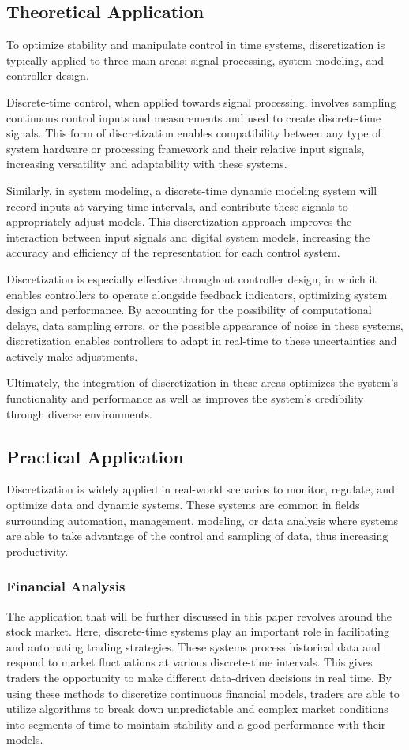 \documentclass{article}
\begin{document}
\subsection{Theoretical Application}
To optimize stability and manipulate control in time systems, discretization is typically applied to three main areas: signal processing, system modeling, and controller design. 

Discrete-time control, when applied towards signal processing, involves sampling continuous control inputs and measurements and used to create discrete-time signals. This form of discretization enables compatibility between any type of system hardware or processing framework and their relative input signals, increasing versatility and adaptability with these systems. 

Similarly, in system modeling, a discrete-time dynamic modeling system will record inputs at varying time intervals, and contribute these signals to appropriately adjust models. This discretization approach improves the interaction between input signals and digital system models, increasing the accuracy and efficiency of the representation for each control system. 

Discretization is especially effective throughout controller design, in which it enables controllers to operate alongside feedback indicators, optimizing system design and performance. By accounting for the possibility of computational delays, data sampling errors, or the possible appearance of noise in these systems, discretization enables controllers to adapt in real-time to these uncertainties and actively make adjustments. 

Ultimately, the integration of discretization in these areas optimizes the system’s functionality and performance as well as improves the system's credibility through diverse environments. \cite{keles2024}

\subsection{Practical Application}
Discretization is widely applied in real-world scenarios to monitor, regulate, and optimize data and dynamic systems. These systems are common in fields surrounding automation, management, modeling, or data analysis where systems are able to take advantage of the control and sampling of data, thus increasing productivity.

\subsubsection{Financial Analysis}
The application that will be further discussed in this paper revolves around the stock market. Here, discrete-time systems play an important role in facilitating and automating trading strategies. These systems process historical data and respond to market fluctuations at various discrete-time intervals. This gives traders the opportunity to make different data-driven decisions in real time. By using these methods to discretize continuous financial models, traders are able to utilize algorithms to break down unpredictable and complex market conditions into segments of time to maintain stability and a good performance with their models. 
\end{document}
